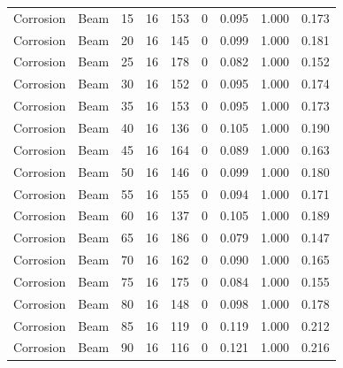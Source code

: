 \begin{table}[H]
\begin{tabular}{llrrrrrrr}
    Corrosion & Beam & 15 & 16 & 153 & 0 & 0.095 & 1.000 & 0.173 \\
    Corrosion & Beam & 20 & 16 & 145 & 0 & 0.099 & 1.000 & 0.181 \\
    Corrosion & Beam & 25 & 16 & 178 & 0 & 0.082 & 1.000 & 0.152 \\
    Corrosion & Beam & 30 & 16 & 152 & 0 & 0.095 & 1.000 & 0.174 \\
    Corrosion & Beam & 35 & 16 & 153 & 0 & 0.095 & 1.000 & 0.173 \\
    Corrosion & Beam & 40 & 16 & 136 & 0 & 0.105 & 1.000 & 0.190 \\
    Corrosion & Beam & 45 & 16 & 164 & 0 & 0.089 & 1.000 & 0.163 \\
    Corrosion & Beam & 50 & 16 & 146 & 0 & 0.099 & 1.000 & 0.180 \\
    Corrosion & Beam & 55 & 16 & 155 & 0 & 0.094 & 1.000 & 0.171 \\
    Corrosion & Beam & 60 & 16 & 137 & 0 & 0.105 & 1.000 & 0.189 \\
    Corrosion & Beam & 65 & 16 & 186 & 0 & 0.079 & 1.000 & 0.147 \\
    Corrosion & Beam & 70 & 16 & 162 & 0 & 0.090 & 1.000 & 0.165 \\
    Corrosion & Beam & 75 & 16 & 175 & 0 & 0.084 & 1.000 & 0.155 \\
    Corrosion & Beam & 80 & 16 & 148 & 0 & 0.098 & 1.000 & 0.178 \\
    Corrosion & Beam & 85 & 16 & 119 & 0 & 0.119 & 1.000 & 0.212 \\
    Corrosion & Beam & 90 & 16 & 116 & 0 & 0.121 & 1.000 & 0.216 \\
    \bottomrule
  \end{tabular}
\end{table}